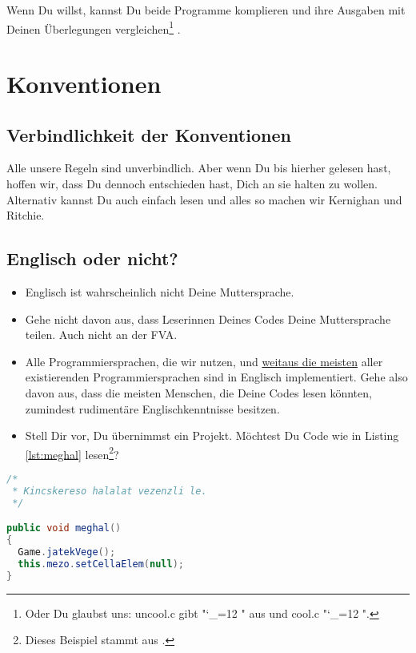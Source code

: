 \documentclass[twoside]{scrreprt}
\begin{document}


Wenn Du willst, kannst Du  beide Programme komplieren und ihre Ausgaben mit
Deinen \"U{}berlegungen vergleichen\footnote{%
%
Oder Du glaubst uns: uncool.c gibt 
"\catcode`_=12 \ttfamily "
aus und cool.c 
"\catcode`_=12 \ttfamily ".
}%
. 

\chapter{Konventionen\label{sec:conventions}}
\section{Verbindlichkeit der Konventionen\label{sec:zwang}}
Alle unsere Regeln sind unverbindlich. Aber wenn Du bis hierher gelesen hast,
hoffen wir, dass Du dennoch entschieden hast, Dich an sie halten zu wollen.
Alternativ kannst Du auch einfach \cite{KR} lesen und alles so machen wir 
Kernighan und Ritchie.

\section{Englisch oder nicht?}
\begin{itemize}
\item Englisch ist wahrscheinlich nicht Deine Muttersprache.
\end{itemize}
\begin{itemize}
\item Gehe nicht davon aus, dass Leserinnen Deines Codes Deine
  Muttersprache teilen. Auch nicht an der FVA.
\item Alle Programmiersprachen, die wir nutzen, und
  \href{http://en.wikipedia.org/wiki/Non-English-based_programming_languages}
  {weitaus die meisten}
  aller existierenden Programmiersprachen sind in Englisch implementiert.
  Gehe also davon aus, dass die meisten Menschen, die Deine Codes lesen
  k\"o{}nnten, zumindest rudiment\"a{}re Englischkenntnisse besitzen.
\item Stell Dir vor, Du \"u{}bernimmst ein Projekt. M\"o{}chtest Du Code wie 
    in Listing \ref{lst:meghal} 
    lesen\footnote{Dieses Beispiel stammt aus \cite{wsp}.}?
\end{itemize}
\begin{lstlisting}[float=h, label=lst:meghal, language=Java]
/*
 * Kincskereso halalat vezenzli le.
 */

public void meghal()
{
  Game.jatekVege();
  this.mezo.setCellaElem(null);
}
\end{lstlisting}
\end{document}
